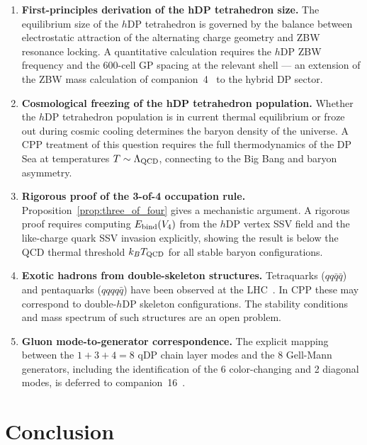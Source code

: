 \documentclass[12pt]{article}
\newcommand{\hDP}{h\mathrm{DP}}
\begin{document}
\begin{enumerate}
\item \label{op:hdp_size}
  \textbf{First-principles derivation of the hDP tetrahedron size.}
  The equilibrium size of the $\hDP$ tetrahedron is governed by the
  balance between electrostatic attraction of the alternating charge
  geometry and ZBW resonance locking.  A quantitative calculation
  requires the $\hDP$ ZBW frequency and the 600-cell GP spacing at
  the relevant shell --- an extension of the ZBW mass calculation
  of companion~4~\cite{c4} to the hybrid DP sector.

\item \textbf{Cosmological freezing of the hDP tetrahedron population.}
  Whether the $\hDP$ tetrahedron population is in current thermal
  equilibrium or froze out during cosmic cooling determines the
  baryon density of the universe.  A CPP treatment of this
  question requires the full thermodynamics of the DP Sea at
  temperatures $T \sim \Lambda_{\rm QCD}$, connecting to the
  Big Bang and baryon asymmetry.

\item \label{op:fourth_vertex}
  \textbf{Rigorous proof of the 3-of-4 occupation rule.}
  Proposition~\ref{prop:three_of_four} gives a mechanistic argument.
  A rigorous proof requires computing $E_{\rm bind}(V_4)$ from
  the $\hDP$ vertex SSV field and the like-charge quark SSV invasion
  explicitly, showing the result is below the QCD thermal threshold
  $k_B T_{\rm QCD}$ for all stable baryon configurations.

\item \label{op:exotic}
  \textbf{Exotic hadrons from double-skeleton structures.}
  Tetraquarks ($qq\bar{q}\bar{q}$) and pentaquarks ($qqqq\bar{q}$)
  have been observed at the LHC~\cite{pdg2022}.  In CPP these
  may correspond to double-$\hDP$ skeleton configurations.
  The stability conditions and mass spectrum of such structures
  are an open problem.

\item \textbf{Gluon mode-to-generator correspondence.}
  The explicit mapping between the $1 + 3 + 4 = 8$ qDP chain
  layer modes and the 8 Gell-Mann generators, including the
  identification of the 6 color-changing and 2 diagonal modes,
  is deferred to companion~16~\cite{c16}.
\end{enumerate}

\section{Conclusion}
\label{sec:conclusion}
\end{document}
